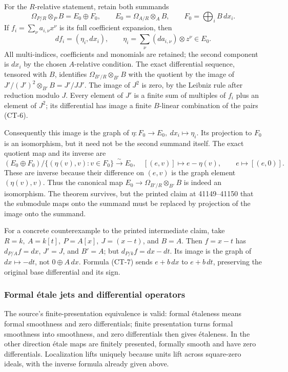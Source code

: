 For the \(R\)-relative statement, retain both summands \[
\Omega_{P/R}\otimes_PB=E_0\oplus F_0,\qquad
E_0=\Omega_{A/R}\otimes_AB,\qquad F_0=\bigoplus_iB\,dx_i.
\] If \(f_i=\sum_\nu a_{i,\nu}x^\nu\) is its full coefficient expansion, then \[
df_i=(\eta_i,dx_i),\qquad
\eta_i=\sum_\nu(da_{i,\nu})\otimes z^\nu\in E_0.
\tag{CT-6}
\] All multi-indices, coefficients and monomials are retained; the second component is \(dx_i\) by the chosen \(A\)-relative condition. The exact differential sequence, tensored with \(B\), identifies \(\Omega_{B'/R}\otimes_{B'}B\) with the quotient by the image of \(J'/(J')^2\otimes_{B'}B=J'/JJ'\). The image of \(J^2\) is zero, by the Leibniz rule after reduction modulo \(J\). Every element of \(J'\) is a finite sum of multiples of \(f_i\) plus an element of \(J^2\); its differential has image a finite \(B\)-linear combination of the pairs (CT-6).

Consequently this image is the graph of \(\eta:F_0\to E_0,\ dx_i\mapsto\eta_i\). Its projection to \(F_0\) is an isomorphism, but it need not be the second summand itself. The exact quotient map and its inverse are \[
(E_0\oplus F_0)/\{(\eta(v),v):v\in F_0\}
\xrightarrow{\sim}E_0,\quad [(e,v)]\mapsto e-\eta(v),
\qquad e\mapsto[(e,0)].
\tag{CT-7}
\] These are inverse because their difference on \((e,v)\) is the graph element \((\eta(v),v)\). Thus the canonical map \(E_0\to\Omega_{B'/R}\otimes_{B'}B\) is indeed an isomorphism. The theorem survives, but the printed claim at 41149--41150 that the submodule maps onto the summand must be replaced by projection of the image onto the summand.

For a concrete counterexample to the printed intermediate claim, take \(R=k,\ A=k[t],\ P=A[x],\ J=(x-t)\), and \(B=A\). Then \(f=x-t\) has \(d_{P/A}f=dx\), \(J'=J\), and \(B'=A\); but \(d_{P/k}f=dx-dt\). Its image is the graph of \(dx\mapsto-dt\), not \(0\oplus A\,dx\). Formula (CT-7) sends \(e+b\,dx\) to \(e+b\,dt\), preserving the original base differential and its sign.

\subsubsection{Formal étale jets and differential operators}\label{algebra-proof-055-formal-uxe9tale-jets-and-differential-operators}

The source's finite-presentation equivalence is valid: formal étaleness means formal smoothness and zero differentials; finite presentation turns formal smoothness into smoothness, and zero differentials then gives étaleness. In the other direction étale maps are finitely presented, formally smooth and have zero differentials. Localization lifts uniquely because units lift across square-zero ideals, with the inverse formula already given above.

